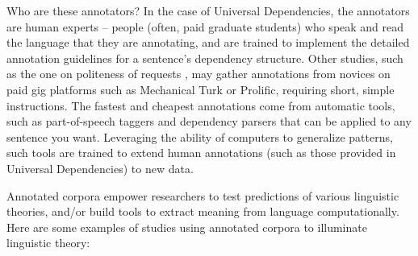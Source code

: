 Who are these annotators?  In the case of Universal Dependencies, the annotators are human experts -- people (often, paid graduate students) who speak and read the language that they are annotating, and are trained to implement the detailed annotation guidelines for a sentence's dependency structure.  Other studies, such as the one on politeness of requests \citep{Danescu-etal:2013}, may gather annotations from novices on paid gig platforms such as Mechanical Turk or Prolific, requiring short, simple instructions.  The fastest and cheapest annotations come from automatic tools, such as part-of-speech taggers and dependency parsers that can be applied to any sentence you want.  Leveraging the ability of computers to generalize patterns, such tools are trained to extend human annotations (such as those provided in Universal Dependencies) to new data. 


Annotated corpora empower researchers to test predictions of various linguistic theories, and/or  build tools to extract meaning from language computationally.  Here are some examples of studies using annotated corpora to illuminate linguistic theory: 


